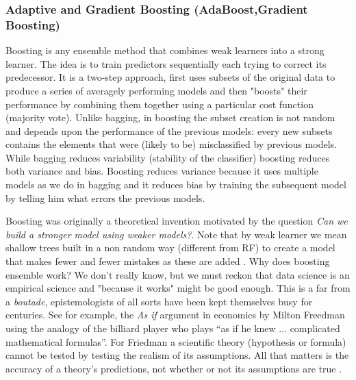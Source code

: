 \documentclass[11pt]{article}
\theoremstyle{definition}
\theoremstyle{remark}
\begin{document}


\subsubsection{Adaptive and Gradient Boosting (AdaBoost,Gradient Boosting)}
\label{sse:ada}

Boosting is any ensemble method that combines weak learners into a strong learner. The idea is to train predictors sequentially each trying to correct its predecessor. It is a two-step approach, first uses subsets of the original data to produce a series of averagely performing models and then "boosts" their performance by combining them together using a particular cost function (majority vote). Unlike bagging, in boosting the subset creation is not random and depends upon the performance of the previous models: every new subsets contains the elements that were (likely to be) misclassified by previous models.
While bagging reduces variability (stability of the classifier) boosting reduces both variance and bias. Boosting reduces variance because it uses multiple models as we do in bagging and it reduces bias by training the subsequent model by telling him what errors the previous models.

Boosting was originally a theoretical invention motivated by the question \emph{Can we build a stronger model using weaker models?}. Note that by weak learner we mean shallow trees built in a non random way (different from RF) to create a model that makes fewer and fewer mistakes as these are added \cite{schapire1990strength}. 
Why does boosting ensemble work? We don't really know, but we must reckon that data science is an empirical science and "because it works" might be good enough. This is a far from a \emph{boutade}, epistemologists of all sorts have been kept themselves busy for centuries. See for example, the \emph{As if} argument in economics by Milton Freedman using the analogy of the billiard player who plays “as if he knew ... complicated mathematical formulas”. For Friedman a scientific theory (hypothesis or formula) cannot be tested by testing the realism of its assumptions. All that matters is the accuracy of a theory’s predictions, not whether or not its assumptions are true \cite{friedman1953essays}. %
\end{document}
